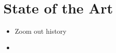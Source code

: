 \chapter{State of the Art}
\label{sec:state_of_art}

\begin{itemize}
    \item Zoom out history \cite{Deamer2016}
    \item 
\end{itemize}